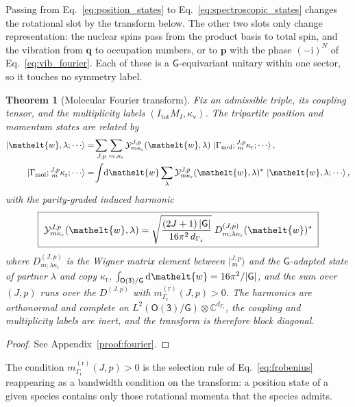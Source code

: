 \documentclass[
  reprint,
  aps,
  prx,
  superscriptaddress,
  amsmath,
  amssymb,
  longbibliography
]{revtex4-2}
\newcommand{\eltfont}[1]{{\let\sigma\eltsigma\mathelt{#1}}}
\newcommand{\grp}[1]{\mathsf{#1}}
\newcommand{\elt}[1]{\eltfont{#1}}
\newcommand{\iunit}{\mathrm{i}}
\newcommand{\diff}{\mathrm{d}}
\newcommand{\irrJp}[2]{D^{(#1,#2)}}
\newcommand{\mult}{\kappa}
\newcommand{\jm}[2]{\bigl\lvert{}^{#1}_{\,#2}\bigr\rangle}
\newcommand{\crep}{\elt{w}}           %
\newcommand{\parity}{p}               %
\newtheorem{theorem}{Theorem}
\providecommand{\Gmol}{\Gamma_{\mathrm{mol}}}
\providecommand{\Grot}{\Gamma_{\mathrm{r}}}
\begin{document}
Passing from Eq.~\eqref{eq:position_states} to Eq.~\eqref{eq:spectroscopic_states} changes the rotational slot by the transform below. The other two slots only change representation: the nuclear spins pass from the product basis to total spin, and the vibration from $\mathbf q$ to occupation numbers, or to $\mathbf p$ with the phase $(-\iunit)^N$ of Eq.~\eqref{eq:vib_fourier}. Each of these is a $\grp{G}$-equivariant unitary within one sector, so it touches no symmetry label.

\begin{theorem}[Molecular Fourier transform]
\label{thm:fourier}
Fix an admissible triple, its coupling tensor, and the multiplicity labels $(I_{\mathrm{tot}}M_I,\mult_{\mathrm v})$. The tripartite position and momentum states are related by
\begin{align}
  \ket{\crep,\lambda;\cdots}
  &=\!\sum_{J,\parity}\sum_{m,\mult_{\mathrm r}}
   \mathcal Y^{J,\parity}_{m\mult_{\mathrm r}}(\crep,\lambda)\,
  \ket{\Gmol;{}^{J,\parity}_{\,m}\mult_{\mathrm r};\cdots},
  \label{eq:ft_forward}\\
  \ket{\Gmol;{}^{J,\parity}_{\,m}\mult_{\mathrm r};\cdots}
  &=\!\int\!\diff\crep\sum_{\lambda}
   \mathcal Y^{J,\parity}_{m\mult_{\mathrm r}}(\crep,\lambda)^{*}\,
  \ket{\crep,\lambda;\cdots},
  \label{eq:ft_inverse}
\end{align}
with the parity-graded induced harmonic
\begin{equation}
  \boxed{\;
  \mathcal Y^{J,\parity}_{m\mult_{\mathrm r}}(\crep,\lambda)=
  \sqrt{\frac{(2J+1)\,|\grp{G}|}{16\pi^{2}\,d_{\Grot}}}\;
  \irrJp{J}{\parity}_{m;\lambda\mult_{\mathrm r}}(\crep)^{*}\;}
  \label{eq:induced-harmonic}
\end{equation}  
where $\irrJp{J}{\parity}_{m;\lambda\mult_{\mathrm r}}$ is the Wigner matrix element between $\jm{J,\parity}{m}$ and the $\grp{G}$-adapted state of partner $\lambda$ and copy $\mult_{\mathrm r}$, $\int_{\grp{O(3)}/\grp{G}}\diff\crep=16\pi^{2}/|\grp{G}|$, and the sum over $(J,\parity)$ runs over the $\irrJp{J}{\parity}$ with $m^{(\mathrm r)}_{\Grot}(J,\parity)>0$. The harmonics are orthonormal and complete on $L^2(\grp{O(3)}/\grp{G})\otimes\mathbb C^{d_{\Grot}}$, the coupling and multiplicity labels are inert, and the transform is therefore block diagonal.
\end{theorem}
\begin{proof}
    See Appendix~\ref{proof:fourier}.
\end{proof}

The condition $m^{(\mathrm r)}_{\Grot}(J,\parity)>0$ is the selection rule of Eq.~\eqref{eq:frobenius} reappearing as a bandwidth condition on the transform: a position state of a given species contains only those rotational momenta that the species admits.
\end{document}
